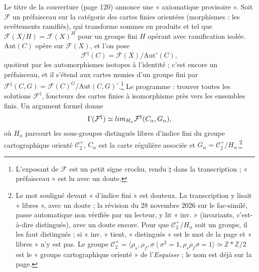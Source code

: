 \documentclass[11pt,a4paper]{article}
\begin{document}
Le titre de la couverture (page 120) annonce une « axiomatique provisoire ».
Soit $\mathcal{F}$ un préfaisceau sur la catégorie des cartes finies orientées
(morphismes : les revêtements ramifiés), qui transforme sommes en produits et
tel que $\mathcal{F}(X/H) = \mathcal{F}(X)^{H}$ pour un groupe fini $H$ opérant
avec ramification isolée. $\mathrm{Aut}(C)$ opère sur $\mathcal{F}(X)$, et l'on
pose
\[
\mathcal{F}^{\natural}(C) = \mathcal{F}(X)/\mathrm{Aut}^{\circ}(C),
\]
quotient par les automorphismes isotopes à l'identité ; c'est encore un
préfaisceau, et il s'étend aux cartes munies d'un groupe fini par
$\mathcal{F}^{\natural}(C, G) = \mathcal{F}(C)^{G}/\mathrm{Aut}(C,
G)^{\circ}$.\footnote{L'exposant de $\mathcal{F}$ est un petit signe crochu,
rendu $\natural$ dans la transcription ; « préfaisceau » est lu avec un
doute.} Le programme : trouver toutes les solutions $\mathcal{F}^{\natural}$,
foncteurs des cartes finies à isomorphisme près vers les ensembles finis. Un
argument formel donne
\[
\Gamma(\mathcal{F}^{\natural}) \simeq \varinjlim_{H_{\alpha}}
\mathcal{F}^{\natural}(C_{\alpha}, G_{\alpha}),
\]
où $H_{\alpha}$ parcourt les sous-groupes distingués libres d'indice fini du
groupe cartographique orienté $\mathcal{C}_{2}^{+}$, $C_{\alpha}$ est la carte
régulière associée et $G_{\alpha} = \mathcal{C}_{2}^{+}/H_{\alpha}$.\footnote{Le
mot souligné devant « d'indice fini » est douteux. La transcription y lisait
« libres », avec un doute ; la révision du 28 novembre 2026 sur le
fac-similé, passe automatique non vérifiée par un lecteur, y lit « inv. »
(invariants, c'est-à-dire distingués), avec un doute encore. Pour que
$\mathcal{C}_{2}^{+}/H_{\alpha}$ soit un groupe, il les faut distingués ; si
« inv. » tient, « distingués » est le mot de la page et « libres » n'y est
pas. Le
groupe $\mathcal{C}_{2}^{+} = \langle \rho_{s}, \rho_{f}, \sigma \mid \sigma^{2} =
1, \rho_{s}\rho_{f}\sigma = 1\rangle \simeq \mathbb{Z} * \mathbb{Z}/2$ est le
« groupe cartographique orienté » de l'\emph{Esquisse} ; le nom est déjà sur
la page.}
\end{document}
